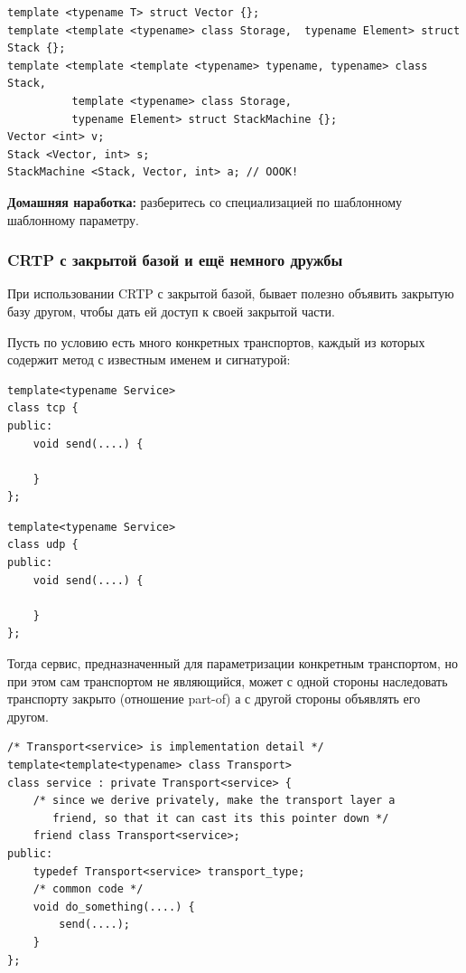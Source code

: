 \documentclass[a4paper,12pt,oneside]{article}
\begin{document}
\begin{lstlisting}
template <typename T> struct Vector {};
template <template <typename> class Storage,  typename Element> struct Stack {};
template <template <template <typename> typename, typename> class Stack, 
          template <typename> class Storage, 
          typename Element> struct StackMachine {};
Vector <int> v;
Stack <Vector, int> s;
StackMachine <Stack, Vector, int> a; // OOOK!
\end{lstlisting}

\textbf{Домашняя наработка:} разберитесь со специализацией по шаблонному шаблонному параметру.

\subsubsection{CRTP с закрытой базой и ещё немного дружбы}\label{ClosedCRTP}

При использовании CRTP с закрытой базой, бывает полезно объявить закрытую базу другом, чтобы дать ей доступ к своей закрытой части.

Пусть по условию есть много конкретных транспортов, каждый из которых содержит метод с известным именем и сигнатурой:

\begin{lstlisting}
template<typename Service>
class tcp {
public:
    void send(....) {

    }
};
\end{lstlisting}

\begin{lstlisting}
template<typename Service>
class udp {
public:
    void send(....) {

    }
};
\end{lstlisting}

Тогда сервис, предназначенный для параметризации конкретным транспортом, но при этом сам транспортом не являющийся, может с одной стороны наследовать транспорту закрыто (отношение part-of) а с другой стороны объявлять его другом.

\begin{lstlisting}
/* Transport<service> is implementation detail */
template<template<typename> class Transport>
class service : private Transport<service> {
    /* since we derive privately, make the transport layer a 
       friend, so that it can cast its this pointer down */
    friend class Transport<service>;
public:
    typedef Transport<service> transport_type;
    /* common code */
    void do_something(....) { 
        send(....);
    }
};
\end{lstlisting}
\end{document}
